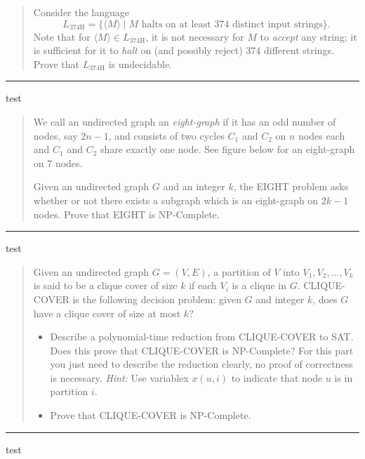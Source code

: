 \documentclass[11pt]{article}
\begin{document}



\begin{quote}
Consider the language $$L_{\text{374H}} = \{ \langle M\rangle
      \mid M \text{~halts on at least 374 distinct input strings}\}.$$ Note that
      for $\langle M\rangle \in L_{\text{374H}}$, it is not necessary
      for $M$ to {\em accept} any string; it is sufficient for it to
      {\em halt} on (and possibly reject) $374$ different strings. Prove that
      $L_{\text{374H}}$ is undecidable.
\end{quote}
\hrule



\begin{solution}
test
\end{solution}


\begin{quote}
We call an undirected graph an \emph{eight-graph} if it has
      an odd number of nodes, say $2n-1$, and consists of two cycles
      $C_1$ and $C_2$ on $n$ nodes each and $C_1$ and $C_2$ share
      exactly one node. See figure below for an eight-graph on $7$
      nodes.

  Given an undirected graph $G$ and an integer $k$, the EIGHT
  problem asks whether or not there exists a subgraph which is an eight-graph
  on $2k-1$ nodes. Prove that EIGHT is NP-Complete.
\end{quote}
\hrule



\begin{solution}
test
\end{solution}


\begin{quote}
Given an undirected graph $G=(V,E)$, a partition of $V$
  into $V_1,V_2,\ldots,V_k$ is said to be a clique cover of size $k$
  if each $V_i$ is a clique in $G$. CLIQUE-COVER is the following
  decision problem: given $G$ and integer $k$, does $G$ have a clique
  cover of size at most $k$?
  \begin{itemize}
  \item Describe a polynomial-time reduction from CLIQUE-COVER to
    SAT. Does this prove that CLIQUE-COVER is NP-Complete? For this
    part you just need to describe the reduction clearly, no proof of
    correctness is necessary. {\em Hint:} Use variablex $x(u,i)$ to
    indicate that node $u$ is in partition $i$.
  \item Prove that CLIQUE-COVER is NP-Complete.
  \end{itemize}
\end{quote}
\hrule



\begin{solution}
test
\end{solution}
\end{document}
